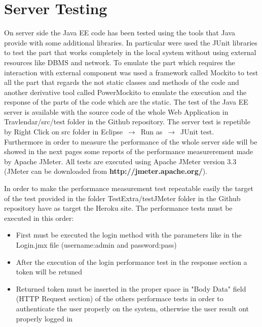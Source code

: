 \documentclass[numbers=noenddot, 12pt, a4paper, oneside]{scrbook}
\begin{document}
\section*{Server Testing}
On server side the Java EE code has been tested using the tools that Java provide with some additional libraries. In particular were used the JUnit libraries to test the part that works completely in the local system without using external resources like DBMS and network.
To emulate the part which requires the interaction with external component was used a framework called Mockito to test all the part that regards the not static classes and methods of the code and another derivative tool called PowerMockito to emulate the execution and the response of the parts of the code which are the static. 
The test of the Java EE server is available with the source code of the whole Web Application in Travlendar/src/test folder in the Github repository.
The server test is repetible by Right Click on src folder in Eclipse $\,\to\,$ Run as $\,\to\,$ JUnit test.\\

Furthermore in order to measure the performance of the whole server side will be showed in the next pages some reports of the performance measurerement made by Apache JMeter.
All tests are executed using Apache JMeter version 3.3 (JMeter can be downloaded from \textbf{http://jmeter.apache.org/}).

In order to make the performance measurement test repeatable easily the target of the test provided in the folder TestExtra/testJMeter folder in the Github repository have as target the Heroku site.
The performance tests must be executed in this order:
\begin{itemize}
	\item First must be executed the login method with the parameters like in the Login.jmx file (username:admin and password:pass)
	\item After the execution of the login performance test in the response section a token will be retuned
	\item Returned token must be inserted in the proper space in "Body Data" field (HTTP Request section) of the others performace tests in order to authenticate the user properly on the system, otherwise the user result ont properly logged in
\end{itemize}
\end{document}
